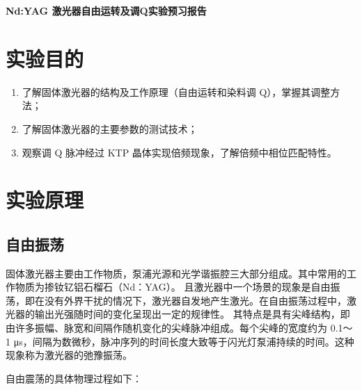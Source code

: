 \documentclass[a4paper,UTF8]{ctexart}
\begin{document}
\begin{center}
    \textbf{\Large Nd:YAG 激光器自由运转及调Q实验预习报告}
    \par {}
\end{center}

\section{实验目的}

\begin{enumerate}
    \item 了解固体激光器的结构及工作原理（自由运转和染料调 Q），掌握其调整方法；
    \item 了解固体激光器的主要参数的测试技术；
    \item 观察调 Q 脉冲经过 KTP 晶体实现倍频现象，了解倍频中相位匹配特性。
\end{enumerate}

\section{实验原理}

\subsection{自由振荡}

固体激光器主要由工作物质，泵浦光源和光学谐振腔三大部分组成。其中常用的工作物质为掺钕钇铝石榴石（Nd：YAG）。
且激光器中一个场景的现象是自由振荡，即在没有外界干扰的情况下，激光器自发地产生激光。在自由振荡过程中，激光器的输出光强随时间的变化呈现出一定的规律性。
其特点是具有尖峰结构，即由许多振幅、脉宽和间隔作随机变化的尖峰脉冲组成。每个尖峰的宽度约为 0.1～1 μs，间隔为数微秒，脉冲序列的时间长度大致等于闪光灯泵浦持续的时间。这种现象称为激光器的弛豫振荡。

自由震荡的具体物理过程如下：
\end{document}

